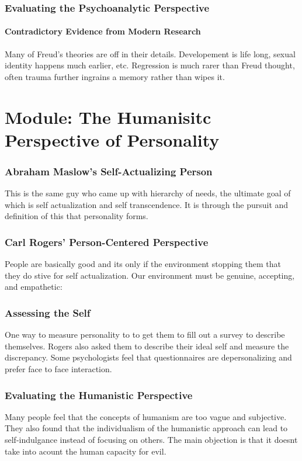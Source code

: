 \documentclass[12pt]{article}
\begin{document}
\section*{Evaluating the Psychoanalytic Perspective}
\subsection*{Contradictory Evidence from Modern Research}
Many of Freud's theories are off in their details. Developement is life long, sexual identity happens much earlier, etc. Regression is much rarer than Freud thought, often trauma further ingrains a memory rather than wipes it.

\part*{Module: The Humanisitc Perspective of Personality} 
\section*{Abraham Maslow's Self-Actualizing Person}
This is the same guy who came up with hierarchy of needs, the ultimate goal of which is self actualization and self transcendence. It is through the pursuit and definition of this that personality forms.
\section*{Carl Rogers' Person-Centered Perspective}
People are basically good and its only if the environment stopping them that they do stive for self actualization. Our environment must be genuine, accepting, and empathetic:
\section*{Assessing the Self}
One way to measure personality to to get them to fill out a survey to describe themselves. Rogers also asked them to describe their ideal self and measure the discrepancy. Some psychologists feel that questionnaires are depersonalizing and prefer face to face interaction.
\section*{Evaluating the Humanistic Perspective}
Many people feel that the concepts of humanism are too vague and subjective. They also found that the individualism of the humanistic approach can lead to self-indulgance instead of focusing on others. The main objection is that it doesnt take into acount the human capacity for evil. 
\end{document}
